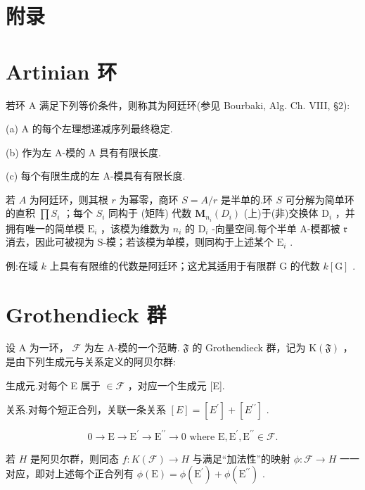 \documentclass[10pt]{article}
\begin{document}
\section*{附录}

\section*{Artinian 环}

若环 A 满足下列等价条件，则称其为阿廷环(参见 Bourbaki, Alg. Ch. VIII, §2):

(a) A 的每个左理想递减序列最终稳定.

(b) 作为左 A-模的 A 具有有限长度.

(c) 每个有限生成的左 A-模具有有限长度.

若 \(A\) 为阿廷环，则其根 \(r\) 为幂零，商环 \(S = A/r\) 是半单的.环 \(S\) 可分解为简单环的直积 \(\prod {S}_{i}\) ；每个 \({S}_{i}\) 同构于 (矩阵) 代数 \({\mathbf{M}}_{{n}_{i}}\left( {D}_{i}\right)\) (上)于(非)交换体 \({\mathrm{D}}_{i}\) ，并拥有唯一的简单模 \({\mathrm{E}}_{i}\) ，该模为维数为 \({n}_{i}\) 的 \({\mathrm{D}}_{i}\) -向量空间.每个半单 A-模都被 \(\mathfrak{r}\) 消去，因此可被视为 S-模；若该模为单模，则同构于上述某个 \({\mathrm{E}}_{i}\) .

例:在域 \(k\) 上具有有限维的代数是阿廷环；这尤其适用于有限群 \(\mathrm{G}\) 的代数 \(k\left\lbrack  \mathrm{G}\right\rbrack\) .

\section*{Grothendieck 群}

设 A 为一环， \(\mathcal{F}\) 为左 A-模的一个范畴. \(\mathfrak{F}\) 的 Grothendieck 群，记为 \(\mathrm{K}\left( \mathfrak{F}\right)\) ，是由下列生成元与关系定义的阿贝尔群:

生成元.对每个 E 属于 \(\in  \mathcal{F}\) ，对应一个生成元 [E].

关系.对每个短正合列，关联一条关系 \(\left\lbrack  E\right\rbrack   = \left\lbrack  {E}^{\prime }\right\rbrack   + \left\lbrack  {E}^{\prime \prime }\right\rbrack\) .

\[
0 \rightarrow  \mathrm{E} \rightarrow  {\mathrm{E}}^{\prime } \rightarrow  {\mathrm{E}}^{\prime \prime } \rightarrow  0\text{ where }\mathrm{E},{\mathrm{E}}^{\prime },{\mathrm{E}}^{\prime \prime } \in  \mathcal{F}.
\]

若 \(H\) 是阿贝尔群，则同态 \(f : K\left( \mathcal{F}\right)  \rightarrow  H\) 与满足“加法性”的映射 \(\phi  : \mathcal{F} \rightarrow  H\) 一一对应，即对上述每个正合列有 \(\phi \left( \mathrm{E}\right)  = \phi \left( {\mathrm{E}}^{\prime }\right)  + \phi \left( {\mathrm{E}}^{\prime \prime }\right)\) .
\end{document}
